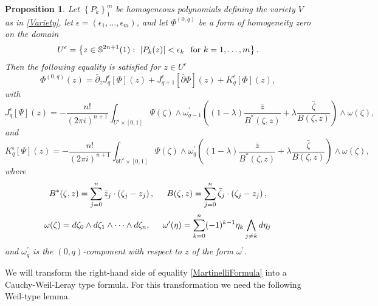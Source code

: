 \documentclass[11pt,reqno]{amsart}
\numberwithin{equation}{section}
\newtheorem{proposition}{Proposition}[section]
\begin{document}
\begin{proposition}\label{Bochner} Let $\left\{P_k\right\}_1^m$ be homogeneous polynomials
defining the variety $V$ as in \eqref{Variety},
let $\epsilon=\left(\epsilon_1,\dots,\epsilon_m\right)$,
and let $\Phi^{(0,q)}$ be a form of homogeneity zero on the domain
\begin{equation}\label{Uepsilon}
U^{\epsilon}=\left\{z\in {{\mathbb S}}^{2n+1}(1):\ \left|P_k(z)\right|<\epsilon_k\hspace{0.1in} \text{for}\
k=1,\dots,m\right\}.
\end{equation}
\indent
Then the following equality is satisfied for $z\in U^{\epsilon}$
\begin{equation}\label{MartinelliFormula}
\Phi^{(0,q)}(z)=\bar\partial_zJ_q^{\epsilon}\left[\Phi\right](z)
+J_{q+1}^{\epsilon}\left[\bar\partial\Phi\right](z)+K_q^{\epsilon}\left[\Phi\right](z),
\end{equation}
with
\begin{equation*}
J_q^{\epsilon}\left[\Psi\right](z)
=-\frac{n!}{(2\pi i)^{n+1}}\int_{U^{\epsilon}\times[0,1]}
\Psi(\zeta)\wedge\omega^{\prime}_{q-1}\left((1-\lambda)\frac{\bar z}{B^*(\zeta,z)}
+\lambda\frac{\bar\zeta}{B(\zeta,z)}\right)\wedge\omega(\zeta),
\end{equation*}
and
\begin{equation*}
K_q^{\epsilon}\left[\Psi\right](z)
=-\frac{n!}{(2\pi i)^{n+1}}\int_{bU^{\epsilon}\times[0,1]}
\Psi(\zeta)\wedge\omega^{\prime}_q\left((1-\lambda)\frac{\bar z}
{B^*(\zeta,z)}+\lambda\frac{\bar\zeta}{B(\zeta,z)}\right)\wedge\omega(\zeta),
\end{equation*}
where
$$B^*(\zeta,z)=\sum_{j=0}^n{\bar z}_j\cdot\left(\zeta_j-z_j\right),
\hspace{0.2in}B(\zeta,z)=\sum_{j=0}^n{\bar\zeta}_j\cdot\left(\zeta_j-z_j\right),$$
$$\omega(\zeta)=d\zeta_0\wedge d\zeta_1\wedge\cdots\wedge d\zeta_n,\hspace{0.2in}
\omega^{\prime}(\eta)=\sum_{k=0}^n(-1)^{k-1}\eta_k\bigwedge_{j\neq k}d\eta_j$$
and $\omega^{\prime}_q$ is the $(0,q)$-component with respect to $z$ of the form
$\omega^{\prime}$.
\end{proposition}

\indent
We will transform the right-hand side of equality \eqref{MartinelliFormula} into a Cauchy-Weil-Leray
type formula. For this transformation we need the following Weil-type lemma.
\end{document}
